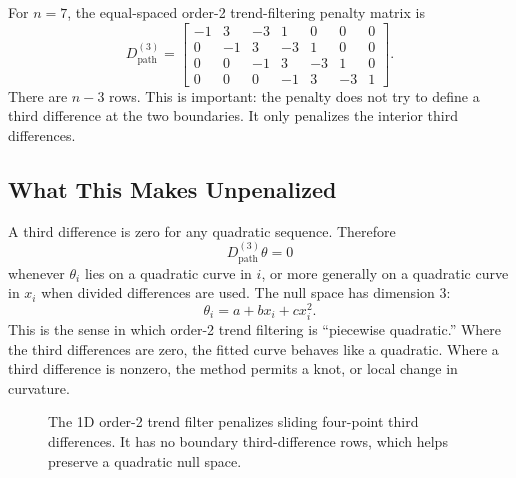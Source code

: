 \documentclass[11pt]{article}
\begin{document}
For \(n=7\), the equal-spaced order-2 trend-filtering penalty matrix is
\[
D^{(3)}_{\mathrm{path}}
=
\begin{bmatrix}
-1 &  3 & -3 &  1 &  0 &  0 &  0\\
 0 & -1 &  3 & -3 &  1 &  0 &  0\\
 0 &  0 & -1 &  3 & -3 &  1 &  0\\
 0 &  0 &  0 & -1 &  3 & -3 &  1
\end{bmatrix}.
\]
There are \(n-3\) rows.  This is important: the penalty does not try to define
a third difference at the two boundaries.  It only penalizes the interior
third differences.

\subsection{What This Makes Unpenalized}

A third difference is zero for any quadratic sequence.  Therefore
\[
  D^{(3)}_{\mathrm{path}}\theta = 0
\]
whenever \(\theta_i\) lies on a quadratic curve in \(i\), or more generally
on a quadratic curve in \(x_i\) when divided differences are used.  The null
space has dimension \(3\):
\[
  \theta_i = a + b x_i + c x_i^2.
\]
This is the sense in which order-2 trend filtering is ``piecewise quadratic.''
Where the third differences are zero, the fitted curve behaves like a quadratic.
Where a third difference is nonzero, the method permits a knot, or local change
in curvature.

\begin{figure}[ht]
\centering
{}
\caption{The 1D order-2 trend filter penalizes sliding four-point third
differences.  It has no boundary third-difference rows, which helps preserve a
quadratic null space.}
\end{figure}
\end{document}
